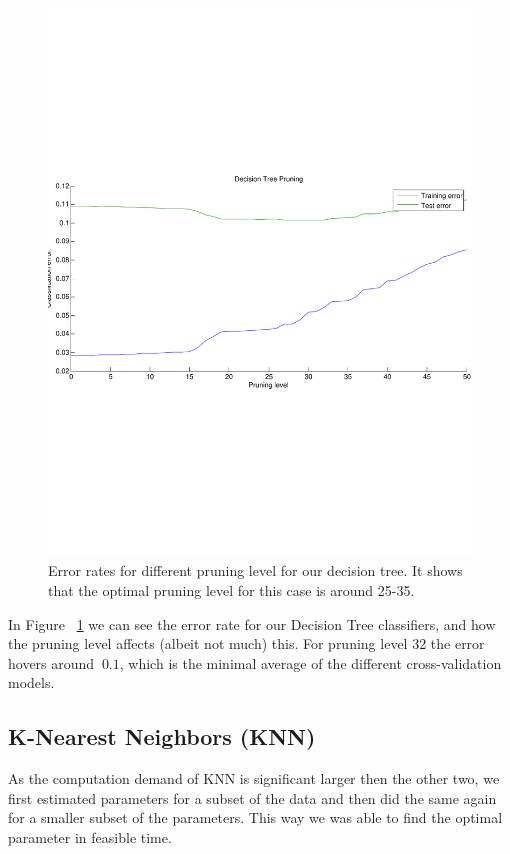\begin{figure}[H]
\centering
\includegraphics[width=0.6\linewidth, trim= 0mm 70mm 0mm 70mm, clip]{code/decision_tree_pruning}
\caption{Error rates for different pruning level for our decision tree. It shows that the optimal pruning level for this case is around 25-35.}
\label{fig:dec_tree}
\end{figure}

In Figure ~\ref{fig:dec_tree} we can see the error rate for our Decision Tree classifiers, and how the pruning level affects (albeit not much) this. For pruning level 32 the error hovers around $~0.1$, which is the minimal average of the different cross-validation models.

\subsection{K-Nearest Neighbors (KNN)}
As the computation demand of KNN is significant larger then the other two, we first estimated parameters for a subset of the data and then did the same again for a smaller subset of the parameters. This way we was able to find the optimal parameter in feasible time.

